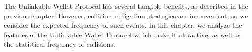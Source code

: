 The Unlinkable Wallet Protocol has several tangible benefits, as described in the previous chapter.
However, collision mitigation strategies are inconvenient, so we consider the expected frequency of such events.
In this chapter, we analyze the features of the Unlinkable Wallet Protocol which make it attractive,
    as well as the statistical frequency of collisions.
